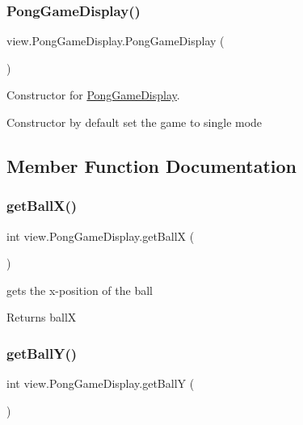 \subsubsection{\texorpdfstring{Pong\+Game\+Display()}{PongGameDisplay()}}
{\footnotesize\ttfamily view.\+Pong\+Game\+Display.\+Pong\+Game\+Display (\begin{DoxyParamCaption}{ }\end{DoxyParamCaption})}



Constructor for \hyperlink{classview_1_1_pong_game_display}{Pong\+Game\+Display}. 

Constructor by default set the game to single mode 

\subsection{Member Function Documentation}
\hypertarget{classview_1_1_pong_game_display_a83584a112f5bd8877e1bbb1d74dfa080}{}\label{classview_1_1_pong_game_display_a83584a112f5bd8877e1bbb1d74dfa080} 
\subsubsection{\texorpdfstring{get\+Ball\+X()}{getBallX()}}
{\footnotesize\ttfamily int view.\+Pong\+Game\+Display.\+get\+BallX (\begin{DoxyParamCaption}{ }\end{DoxyParamCaption})}



gets the x-\/position of the ball 

\begin{DoxyReturn}{Returns}
ballX 
\end{DoxyReturn}
\hypertarget{classview_1_1_pong_game_display_a940198a68c987548b182d18069ba5885}{}\label{classview_1_1_pong_game_display_a940198a68c987548b182d18069ba5885} 
\subsubsection{\texorpdfstring{get\+Ball\+Y()}{getBallY()}}
{\footnotesize\ttfamily int view.\+Pong\+Game\+Display.\+get\+BallY (\begin{DoxyParamCaption}{ }\end{DoxyParamCaption})}



